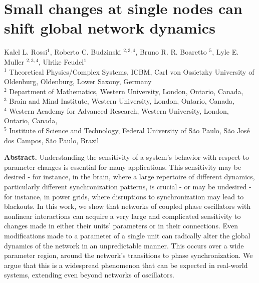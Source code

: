\chapter{Small changes at single nodes can shift global network dynamics} \label{chap:malleability}

\begin{center}
    {\large Kalel L. Rossi$^{1}$, Roberto C. Budzinski $^{2,3,4}$, Bruno R. R. Boaretto $^{5}$, Lyle E. Muller $^{2,3,4}$, Ulrike Feudel$^{1}$ } \\[1em]
    {\small $^1$ Theoretical Physics/Complex Systems, ICBM, Carl von Ossietzky University of Oldenburg, Oldenburg, Lower Saxony, Germany \\ $^2$ Department of Mathematics, Western University, London, Ontario, Canada, \\ $^3$ Brain and Mind Institute, Western University, London, Ontario, Canada, \\ $^4$ Western Academy for Advanced Research, Western University, London, Ontario, Canada, \\ $^5$ Institute of Science and Technology, Federal University of São Paulo, São José dos Campos, São Paulo, Brazil}
\end{center}


\vspace{1.5em}
\noindent
\textbf{Abstract.} 
Understanding the sensitivity of a system's behavior with respect to parameter changes is essential for many applications. This sensitivity may be desired - for instance, in the brain, where a large repertoire of different dynamics, particularly different synchronization patterns, is crucial - or may be undesired - for instance, in power grids, where disruptions to synchronization may lead to blackouts. In this work, we show that networks of coupled phase oscillators with nonlinear interactions can acquire a very large and complicated sensitivity to changes made in either their units' parameters or in their connections. Even modifications made to a parameter of a single unit can radically alter the global dynamics of the network in an unpredictable manner. This occurs over a wide parameter region, around the network's transitions to phase synchronization. We argue that this is a widespread phenomenon that can be expected in real-world systems, extending even beyond networks of oscillators. 
\vspace{1.5em}

